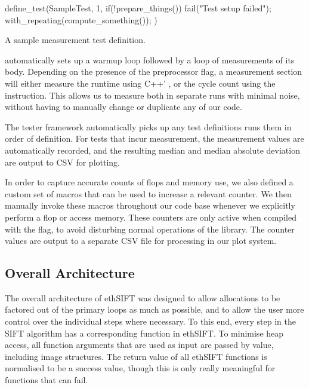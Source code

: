 \documentclass[letterpaper]{article}
\begin{document}
\begin{listing}[ht]
\begin{ccode}
define_test(SampleTest, 1, {
    if(!prepare_things())
      fail("Test setup failed");
    with_repeating(compute_something());
  })
\end{ccode}
\caption{A sample measurement test definition.}
\label{lst:sample-test}
\end{listing}

 automatically sets up a warmup loop followed by a loop of measurements of its body. Depending on the presence of the  preprocessor flag, a measurement section will either measure the runtime using C++' , or the cycle count using the  instruction. This allows us to measure both in separate runs with minimal noise, without having to manually change or duplicate any of our code.

The tester framework automatically picks up any test definitions runs them in order of definition. For tests that incur measurement, the measurement values are automatically recorded, and the resulting median and median absolute deviation are output to CSV for plotting.

In order to capture accurate counts of flops and memory use, we also defined a custom set of macros that can be used to increase a relevant counter. We then manually invoke these macros throughout our code base whenever we explicitly perform a flop or access memory. These counters are only active when compiled with the  flag, to avoid disturbing normal operations of the library. The counter values are output to a separate CSV file for processing in our plot system.

\subsection*{Overall Architecture}\label{sec:architecture}
The overall architecture of ethSIFT was designed to allow allocations to be factored out of the primary loops as much as possible, and to allow the user more control over the individual steps where necessary. To this end, every step in the SIFT algorithm has a corresponding function in ethSIFT. To minimise heap access, all function arguments that are used as input are passed by value, including image structures. The return value of all ethSIFT functions is normalised to be a success value, though this is only really meaningful for functions that can fail.
\end{document}
